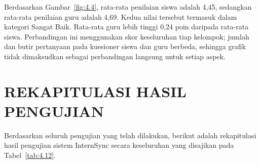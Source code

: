 Berdasarkan Gambar~\ref{fig:4.4}, rata-rata penilaian siswa adalah 4,45, sedangkan rata-rata penilaian guru adalah 4,69. Kedua nilai tersebut termasuk dalam kategori Sangat Baik. Rata-rata guru lebih tinggi 0,24 poin daripada rata-rata siswa. Perbandingan ini menggunakan skor keseluruhan tiap kelompok; jumlah dan butir pertanyaan pada kuesioner siswa dan guru berbeda, sehingga grafik tidak dimaksudkan sebagai perbandingan langsung untuk setiap aspek.

\section{REKAPITULASI HASIL PENGUJIAN}

Berdasarkan seluruh pengujian yang telah dilakukan, berikut adalah rekapitulasi hasil pengujian sistem InternSync secara keseluruhan yang disajikan pada Tabel~\ref{tab:4.12}.

